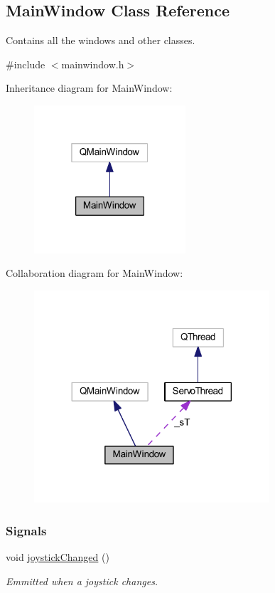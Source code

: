 \hypertarget{a00005}{}\subsection{Main\+Window Class Reference}
\label{a00005}


Contains all the windows and other classes.  




{\ttfamily \#include $<$mainwindow.\+h$>$}



Inheritance diagram for Main\+Window\+:\nopagebreak
\begin{figure}[H]
\begin{center}
\leavevmode
\includegraphics[width=160pt]{db/df3/a00034}
\end{center}
\end{figure}


Collaboration diagram for Main\+Window\+:\nopagebreak
\begin{figure}[H]
\begin{center}
\leavevmode
\includegraphics[width=248pt]{d4/d8c/a00035}
\end{center}
\end{figure}
\subsubsection*{Signals}
\begin{DoxyCompactItemize}
\item 
void \hyperlink{a00005_ac85ba5aec3be2a51a348ff669b9dc842}{joystick\+Changed} ()
\begin{DoxyCompactList}\small\item\em Emmitted when a joystick changes. \end{DoxyCompactList}\end{DoxyCompactItemize}
